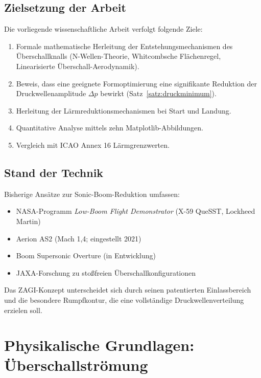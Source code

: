 ﻿\documentclass[12pt,a4paper]{article}
\theoremstyle{definition}
\theoremstyle{remark}
\begin{document}
\subsection{Zielsetzung der Arbeit}

Die vorliegende wissenschaftliche Arbeit verfolgt folgende Ziele:

\begin{enumerate}[label=\arabic*.]
  \item Formale mathematische Herleitung der Entstehungsmechanismen des Überschallknalls
        (N-Wellen-Theorie, Whitcombsche Flächenregel, Linearisierte Überschall-Aerodynamik).
  \item Beweis, dass eine geeignete Formoptimierung eine signifikante Reduktion der
        Druckwellenamplitude $\Delta p$ bewirkt (Satz~\ref{satz:druckminimum}).
  \item Herleitung der Lärmreduktionsmechanismen bei Start und Landung.
  \item Quantitative Analyse mittels zehn Matplotlib-Abbildungen.
  \item Vergleich mit ICAO Annex 16 Lärmgrenzwerten.
\end{enumerate}

\subsection{Stand der Technik}

Bisherige Ansätze zur Sonic-Boom-Reduktion umfassen:
\begin{itemize}
  \item NASA-Programm \emph{Low-Boom Flight Demonstrator} (X-59 QueSST, Lockheed Martin)
  \item Aerion AS2 (Mach 1,4; eingestellt 2021)
  \item Boom Supersonic Overture (in Entwicklung)
  \item JAXA-Forschung zu stoßfreien Überschallkonfigurationen
\end{itemize}
Das ZAGI-Konzept unterscheidet sich durch seinen patentierten Einlassbereich und die
besondere Rumpfkontur, die eine vollständige Druckwellenverteilung erzielen soll.

\section{Physikalische Grundlagen: Überschallströmung}
\label{sec:grundlagen}
\end{document}
